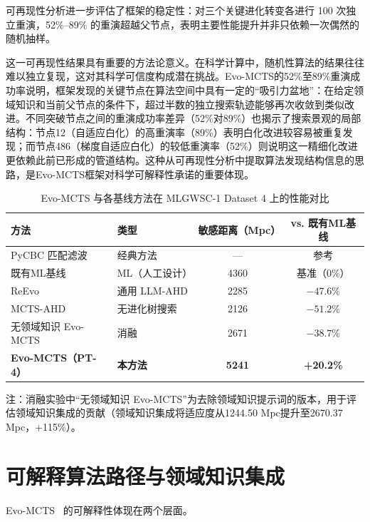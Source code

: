 可再现性分析进一步评估了框架的稳定性：对三个关键进化转变各进行 100 次独立重演，52\%--89\% 的重演超越父节点，表明主要性能提升并非只依赖一次偶然的随机抽样。

这一可再现性结果具有重要的方法论意义。在科学计算中，随机性算法的结果往往难以独立复现，这对其科学可信度构成潜在挑战。Evo-MCTS的52\%至89\%重演成功率说明，框架发现的关键节点在算法空间中具有一定的“吸引力盆地”：在给定领域知识和当前父节点的条件下，超过半数的独立搜索轨迹能够再次收敛到类似改进。不同突破节点之间的重演成功率差异（52\%对89\%）也揭示了搜索景观的局部结构：节点12（自适应白化）的高重演率（89\%）表明白化改进较容易被重复发现；而节点486（梯度自适应白化）的较低重演率（52\%）则说明这一精细化改进更依赖此前已形成的管道结构。这种从可再现性分析中提取算法发现结构信息的思路，是Evo-MCTS框架对科学可解释性承诺的重要体现。

\begin{table}[htbp]
\centering
\caption{Evo-MCTS 与各基线方法在 MLGWSC-1 Dataset 4 上的性能对比}
\label{tab:evomcts_results}
\small
\begin{tabular}{llcc}
\hline
\textbf{方法} & \textbf{类型} & \textbf{敏感距离（Mpc）} & \textbf{vs. 既有ML基线} \\
\hline
PyCBC 匹配滤波 & 经典方法 & — & 参考 \\
既有ML基线 & ML（人工设计） & 4360 & 基准（0\%） \\
\hline
ReEvo & 通用 LLM-AHD & 2285 & $-47.6\%$ \\
MCTS-AHD & 无进化树搜索 & 2126 & $-51.2\%$ \\
无领域知识 Evo-MCTS & 消融 & 2671 & $-38.7\%$ \\
\hline
\textbf{Evo-MCTS（PT-4）} & \textbf{本方法} & \textbf{5241} & \textbf{+20.2\%} \\
\hline
\end{tabular}
\begin{minipage}{\linewidth}
\vspace{1mm}
\small 注：消融实验中“无领域知识 Evo-MCTS”为去除领域知识提示词的版本，用于评估领域知识集成的贡献（领域知识集成将适应度从1244.50 Mpc提升至2670.37 Mpc，+115\%）。
\end{minipage}
\end{table}

\section{可解释算法路径与领域知识集成}

Evo-MCTS~\cite{wang2025evomcts} 的可解释性体现在两个层面。

